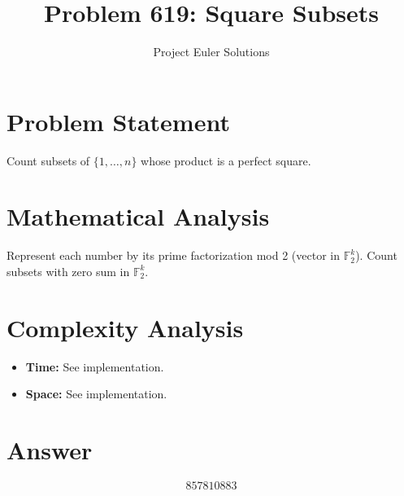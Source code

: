 \documentclass[11pt]{article}
\title{Problem 619: Square Subsets}
\author{Project Euler Solutions}
\date{}
\begin{document}
\maketitle

\section{Problem Statement}
Count subsets of $\{1, \ldots, n\}$ whose product is a perfect square.

\section{Mathematical Analysis}
Represent each number by its prime factorization mod 2 (vector in $\mathbb{F}_2^k$). Count subsets with zero sum in $\mathbb{F}_2^k$.

\section{Complexity Analysis}
\begin{itemize}
    \item \textbf{Time:} See implementation.
    \item \textbf{Space:} See implementation.
\end{itemize}

\section{Answer}

\[
\boxed{857810883}
\]
\end{document}
